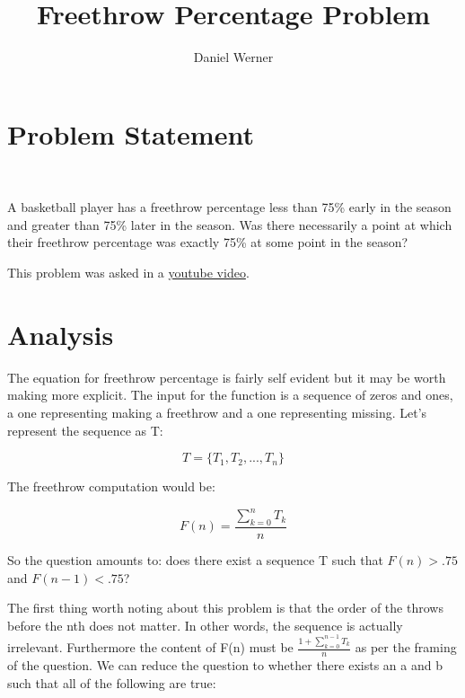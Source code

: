 \documentclass{article}
\title{Freethrow Percentage Problem}
\author{Daniel Werner}
\begin{document}
\maketitle

\section*{Problem Statement}

\

A basketball player has a freethrow percentage less than 75\%
early in the season and greater than 75\% later in the season.
Was there necessarily a point at which their freethrow
percentage was exactly 75\% at some point in the season?

\par

This problem was asked in a 
\href{https://www.youtube.com/watch?v=vqpWwgpDs58}{youtube video}.

\section*{Analysis}

The equation for freethrow percentage is fairly self evident
but it may be worth making more explicit.  The input for
the function is a sequence of zeros and ones, a one
representing making a freethrow and a one representing
missing.  Let's represent the sequence as T:

\begin{equation*}
    T = \{T_1, T_2, ..., T_n\}
\end{equation*}

The freethrow computation would be:

\begin{equation}
    F(n) = \frac{\sum_{k=0}^{n} T_k}{n}
\end{equation}

So the question amounts to: does there exist a sequence T
such that $F(n) > .75$ and $F(n - 1) < .75$?

\par

The first thing worth noting about this problem is that the
order of the throws before the nth does not matter.  In other
words, the sequence is actually irrelevant. Furthermore
the content of F(n) must be $\frac{1 + \sum_{k=0}^{n-1} T_k}{n}$
as per the framing of the question.  We can reduce
the question to whether there exists an a and b such
that all of the following are true:
\end{document}
